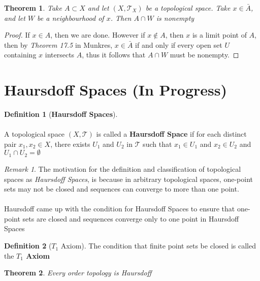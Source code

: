\documentclass{article}
\newtheorem{theorem}{Theorem}[section]
\theoremstyle{remark}
\newtheorem*{remark}{Remark}
\theoremstyle{definition}
\newtheorem{definition}{Definition}[section]
\begin{document}
\newpage

\begin{theorem}
Take $A \subset X$ and let $(X, \mathcal{T}_X)$ be a topological space. Take $x \in \bar{A}$, and let $W$ be a neighbourhood of $x$. Then $A \cap W$ is nonempty
\end{theorem}

\begin{proof}
If $x \in A$, then we are done. However if $x \not\in A$, then $x$ is a limit point of $A$, then by \textit{Theorem 17.5} in Munkres, $x \in \bar{A}$ if and only if every open set $U$ containing $x$ intersects $A$, thus it follows that $A \cap W$ must be nonempty.
\end{proof}

\newpage

\section{Haursdoff Spaces (In Progress)}
\bigskip
\begin{definition}[\textbf{Haursdoff Spaces}]
\\ \\
A topological space $(X, \mathcal{T})$ is called a \textbf{Haursdoff Space} if for each distinct pair $x_1, x_2 \in X$, there exists $U_1$ and $U_2$ in $\mathcal{T}$ such that $x_1 \in U_1$ and $x_2 \in U_2$ and $U_1 \cap U_2 = \emptyset$
\end{definition}
\medskip
\begin{remark}
The motivation for the definition and classification of topological spaces as \textit{Haursdoff Spaces}, is because in arbitrary topological spaces, one-point sets may not be closed and sequences can converge to more than one point. 
\\ \\
Haursdoff came up with the condition for Haursdoff Spaces to ensure that one-point sets are closed and sequences converge only to one point in Haursdoff Spaces
\end{remark}

\begin{definition}[$T_1$ Axiom]
The condition that finite point sets be closed is called the \textbf{$T_1$ Axiom}

\end{definition}

\begin{theorem}
Every order topology is Haursdoff
\end{theorem}
\end{document}

